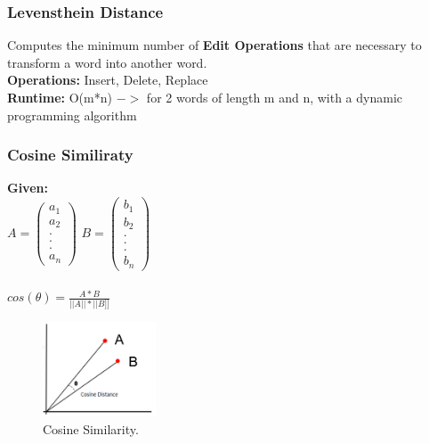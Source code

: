 \documentclass[../MLDM_Main.tex]{subfiles}
\begin{document}
\subsubsection{Levensthein Distance}
Computes the minimum number of \textbf{Edit Operations} that are necessary to transform a word into another word.\\
\textbf{Operations:} Insert, Delete, Replace\\
\textbf{Runtime:} O(m*n) $->$ for 2 words of length m and n, with a dynamic programming algorithm

\subsubsection{Cosine Similiraty}
\textbf{Given:}\\
$A = \left(
	 \begin{array}{c}
	 a_1\\
	 a_2\\
	 .\\
	 .\\
	 .\\
	 a_n
	 \end{array}
	 \right)$ $B = \left(
	 \begin{array}{c}
	 b_1\\
	 b_2\\
	 .\\
	 .\\
	 .\\
	 b_n
	 \end{array}
	 \right)$\\\\

$cos(\theta) = \frac{A * B}{||A||*||B]]}$
\begin{figure}[H]
\centering
\includegraphics[width=0.3\textwidth]{images/CosineSimilarity.png}
\caption{\label{fig:Cosine Similarity}Cosine Similarity.}
\end{figure}
\end{document}
